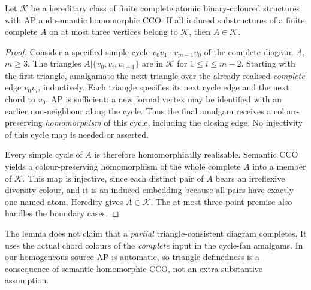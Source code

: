 
\begin{lemma}
\label{lem:cco-triangle-fullness}
Let $\mathcal K$ be a hereditary class of finite complete atomic
binary-coloured structures with AP and semantic homomorphic CCO.  If
all induced substructures of a finite complete $A$ on at most three
vertices belong to $\mathcal K$, then $A\in\mathcal K$.
\end{lemma}
\begin{proof}
Consider a specified simple cycle $v_0v_1\cdots v_{m-1}v_0$
of the complete diagram $A$, $m\ge3$.  The triangles
$A|\{v_0,v_i,v_{i+1}\}$ are in $\mathcal K$ for $1\le i\le m-2$.
Starting with the first triangle, amalgamate the next triangle over
the already realised \emph{complete} edge $v_0v_i$, inductively.
Each triangle specifies its next cycle edge and the next chord to
$v_0$.  AP is sufficient: a new formal vertex may be identified with
an earlier non-neighbour along the cycle.  Thus the final amalgam
receives a colour-preserving \emph{homomorphism} of this cycle,
including the closing edge.  No injectivity of this cycle map is
needed or asserted.

Every simple cycle of $A$ is therefore homomorphically realisable.
Semantic CCO yields a colour-preserving homomorphism of the whole
complete $A$ into a member of $\mathcal K$.  This map is injective,
since each distinct pair of $A$ bears an irreflexive diversity colour,
and it is an induced embedding because all pairs have exactly one
named atom.  Heredity gives $A\in\mathcal K$.
The at-most-three-point premise also handles the boundary cases.
\end{proof}
\begin{remark}
The lemma does not claim that a \emph{partial} triangle-consistent
diagram completes.  It uses the actual chord colours of the
\emph{complete} input in the cycle-fan amalgams.  In our homogeneous
source AP is automatic, so triangle-definedness is a consequence of
semantic homomorphic CCO, not an extra substantive assumption.
\end{remark}
